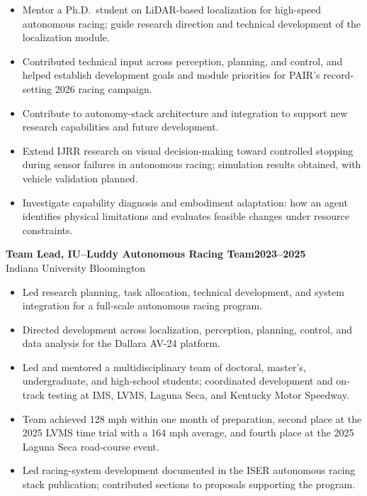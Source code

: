\documentclass[11pt,letterpaper]{article}
\newcommand{\entry}[3]{
    \Needspace{4\baselineskip}
    \textbf{#1}\hfill\textbf{#2}\\
    #3\par
}
\begin{document}
\begin{itemize}
    \item Mentor a Ph.D.\ student on LiDAR-based localization
    for high-speed autonomous racing; guide research direction
    and technical development of the localization module.

    \item Contributed technical input across perception,
    planning, and control, and helped establish development
    goals and module priorities for PAIR's record-setting
    2026 racing campaign.

    \item Contribute to autonomy-stack architecture and
    integration to support new research capabilities and
    future development.

    \item Extend IJRR research on visual decision-making toward
    controlled stopping during sensor failures in autonomous
    racing; simulation results obtained, with vehicle
    validation planned.

    \item Investigate capability diagnosis and embodiment
    adaptation: how an agent identifies physical limitations
    and evaluates feasible changes under resource constraints.
\end{itemize}

\entry{Team Lead, IU--Luddy Autonomous Racing Team}{2023--2025}
{Indiana University Bloomington}

\begin{itemize}
    \item Led research planning, task allocation, technical
    development, and system integration for a full-scale
    autonomous racing program.

    \item Directed development across localization, perception,
    planning, control, and data analysis for the Dallara AV-24
    platform.

    \item Led and mentored a multidisciplinary team of doctoral,
    master's, undergraduate, and high-school students;
    coordinated development and on-track testing at IMS,
    LVMS, Laguna Seca, and Kentucky Motor Speedway.

    \item Team achieved 128 mph within one month of preparation,
    second place at the 2025 LVMS time trial with a 164 mph
    average, and fourth place at the 2025 Laguna Seca
    road-course event.

    \item Led racing-system development documented in the ISER
    autonomous racing stack publication; contributed sections
    to proposals supporting the program.
\end{itemize}
\end{document}
